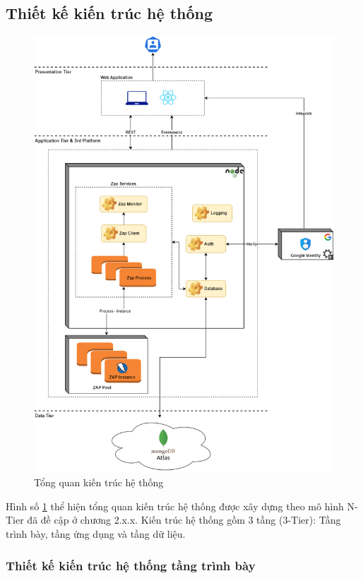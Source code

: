 \subsection{Thiết kế kiến trúc hệ thống}
\begin{figure}[H]
      \centering
      \includegraphics[width=\textwidth]{applied-thesis-chapters/chapter-3/Tổng quan kiến trúc hệ thống.png}
      \caption{Tổng quan kiến trúc hệ thống}
      \label{fig:KienTrucHeThong}
\end{figure}
\tab Hình số \ref{fig:KienTrucHeThong} thể hiện tổng quan kiến trúc hệ thống được xây dựng theo mô hình N-Tier đã đề cập ở chương 2.x.x.
Kiến trúc hệ thống gồm 3 tầng (3-Tier): Tầng trình bày, tầng ứng dụng và tầng dữ liệu.

\subsubsection{Thiết kế kiến trúc hệ thống tầng trình bày}

